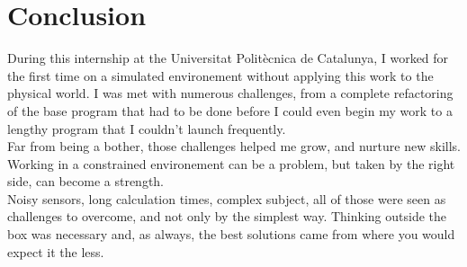 \chapter{Conclusion}

\label{conclusion}

During this internship at the Universitat Politècnica de Catalunya, I worked for the first time on a simulated environement without applying this work to the physical world.
I was met with numerous challenges, from a complete refactoring of the base program that had to be done before I could even begin my work to a lengthy program that I couldn't launch frequently.\\

Far from being a bother, those challenges helped me grow, and nurture new skills. Working in a constrained environement can be a problem, but taken by the right side, can become a strength.\\

Noisy sensors, long calculation times, complex subject, all of those were seen as challenges to overcome, and not only by the simplest way.
Thinking outside the box was necessary and, as always, the best solutions came from where you would expect it the less.
